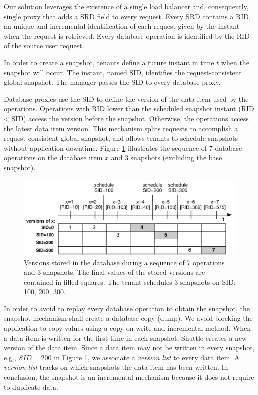 Our solution leverages the existence of a single load balancer and, consequently, single proxy that adds a \ac{SRD} field to every request. Every \ac{SRD} contains a \ac{RID}, an unique and incremental identification of each request given by the instant when the request is retrieved. Every database operation is identified by the \ac{RID} of the source user request.

In order to create a snapshot, tenants define a future instant in time $t$ when the snapshot will occur. The instant, named \ac{SID}, identifies the request-consistent global snapshot. The manager passes the \ac{SID} to every database proxy.

Database proxies use the \ac{SID} to define the version of the data item used by the operations. Operations with \ac{RID} lower than the scheduled snapshot instant (\ac{RID} < \ac{SID}) access the version before the snapshot. Otherwise, the operations access the latest data item version. This mechanism splits requests to accomplish a request-consistent global snapshot, and allows tenants to schedule snapshots without application downtime. Figure \ref{fig:snapshots} illustrates the sequence of 7 database operations on the database item $x$ and 3 snapshots (excluding the base snapshot).

\begin{figure}
\centering
  \includegraphics[width=130mm]{images/snapshots}
  \caption[Snapshot versions stored in the database]{Versions stored in the database during a sequence of 7 operations and 3 snapshots. The final values of the stored versions are contained in filled squares. The tenant schedules 3 snapshots on SID: 100, 200, 300.}
\label{fig:snapshots}
\end{figure}

In order to avoid to replay every database operation to obtain the snapshot, the snapshot mechanism shall create a database copy (dump). We avoid blocking the application to copy values using a copy-on-write and incremental method. When a data item is written for the first time in each snapshot, Shuttle creates a new version of the data item. Since a data item may not be written in every snapshot, e.g., $SID=200$ in Figure \ref{fig:snapshots}, we associate a \emph{version list} to every data item. A \emph{version list} tracks on which snapshots the data item has been written. In conclusion, the snapshot is an incremental mechanism because it does not require to duplicate data.\\


